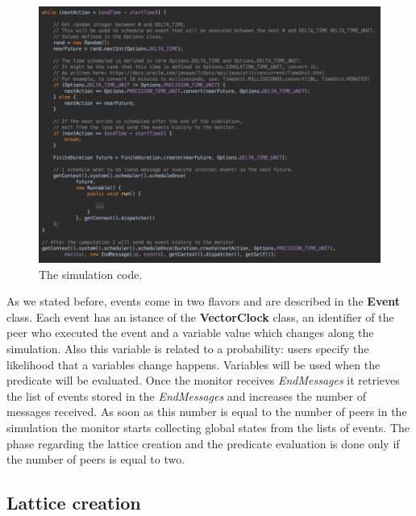 \documentclass[11pt]{article}
\begin{document}
\begin{figure}[!ht]
\includegraphics[width=\textwidth]{scheduler}
\caption{The simulation code.}
\label{fig:scheduler}
\end{figure}

\noindent
As we stated before, events come in two flavors and are described in the \textbf{Event} class. Each event has an istance of the \textbf{VectorClock} class, an identifier of the peer who executed the event and a variable value which changes along the simulation. Also this variable is related to a probability: users specify the likelihood that a variables change happens. Variables will be used when the predicate will be evaluated. Once the monitor receives \textit{EndMessages} it retrieves the list of events stored in the \textit{EndMessages} and increases the number of messages received. As soon as this number is equal to the number of peers in the simulation the monitor starts collecting global states from the lists of events. The phase regarding the lattice creation and the predicate evaluation is done only if the number of peers is equal to two.

\subsection{Lattice creation}
\end{document}
